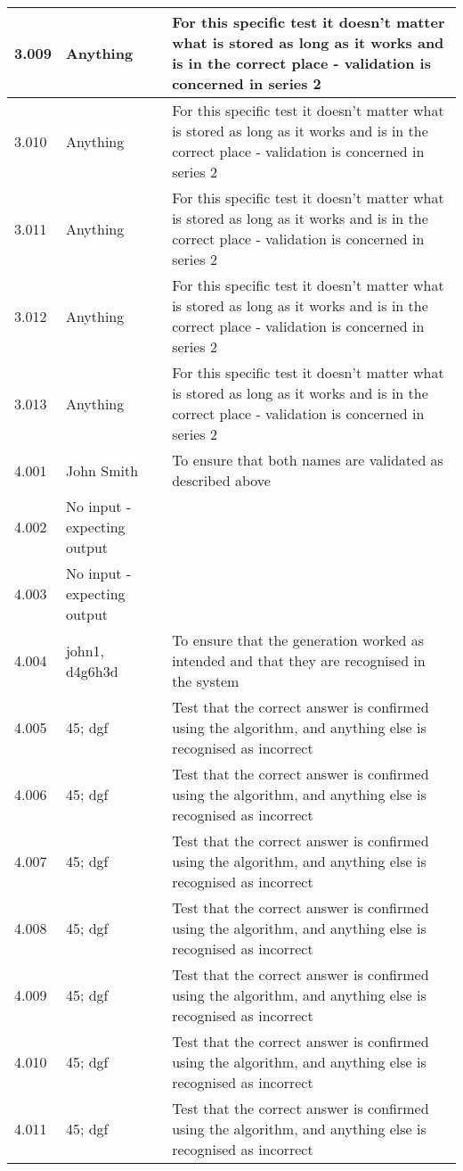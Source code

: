 \begin{landscape}
\begin{center}
\begin{longtable}{|p{4cm}|p{4cm}|p{5cm}|}
3.009 & Anything & For this specific test it doesn't matter what is stored as long as it works and is in the correct place - validation is concerned in series 2 \\ \hline
3.010 & Anything & For this specific test it doesn't matter what is stored as long as it works and is in the correct place - validation is concerned in series 2 \\ \hline
3.011 & Anything & For this specific test it doesn't matter what is stored as long as it works and is in the correct place - validation is concerned in series 2 \\ \hline
3.012 & Anything & For this specific test it doesn't matter what is stored as long as it works and is in the correct place - validation is concerned in series 2 \\ \hline
3.013 & Anything & For this specific test it doesn't matter what is stored as long as it works and is in the correct place - validation is concerned in series 2 \\ \hline
4.001 & John Smith & To ensure that both names are validated as described above \\ \hline
4.002 & No input - expecting output & \\ \hline
4.003 & No input - expecting output & \\ \hline
4.004 & john1, d4g6h3d & To ensure that the generation worked as intended and that they are recognised in the system \\ \hline
4.005 & 45; dgf & Test that the correct answer is confirmed using the algorithm, and anything else is recognised as incorrect \\ \hline
4.006 & 45; dgf & Test that the correct answer is confirmed using the algorithm, and anything else is recognised as incorrect \\ \hline
4.007 & 45; dgf & Test that the correct answer is confirmed using the algorithm, and anything else is recognised as incorrect \\ \hline
4.008 & 45; dgf & Test that the correct answer is confirmed using the algorithm, and anything else is recognised as incorrect \\ \hline
4.009 & 45; dgf & Test that the correct answer is confirmed using the algorithm, and anything else is recognised as incorrect \\ \hline
4.010 & 45; dgf & Test that the correct answer is confirmed using the algorithm, and anything else is recognised as incorrect \\ \hline
4.011 & 45; dgf & Test that the correct answer is confirmed using the algorithm, and anything else is recognised as incorrect \\ \hline

\end{longtable}
\end{center}
\end{landscape}
